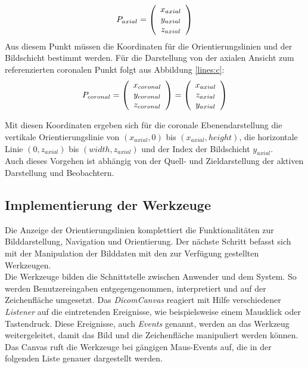 \begin{equation}
P_{axial}=\left(\begin{array}{c} x_{axial} \\ y_{axial} \\ z_{axial} \end{array}\right) 
\vspace{0.5cm}
\end{equation}
Aus diesem Punkt müssen die Koordinaten für die Orientierungslinien und der Bildschicht bestimmt werden.
Für die Darstellung von der axialen Ansicht zum referenzierten coronalen Punkt folgt aus Abbildung \ref{lines:c}:
\begin{equation}
P_{coronal}=\left(\begin{array}{c} x_{coronal} \\ y_{coronal} \\ z_{coronal} \end{array}\right) =
\left(\begin{array}{c} x_{axial} \\ z_{axial} \\ y_{axial} \end{array}\right)
\vspace{0.5cm}
\end{equation}

Mit diesen Koordinaten ergeben sich für die coronale Ebenendarstellung die vertikale Orientierungslinie von $(x_{axial}, 0)$ bis $(x_{axial}, height)$, die horizontale Linie $(0, z_{axial})$ bis $(width, z_{axial})$ und der Index der Bildschicht $y_{axial}$.\\
Auch dieses Vorgehen ist abhängig von der Quell- und Zieldarstellung der aktiven Darstellung und Beobachtern.

\subsection{Implementierung der Werkzeuge}

Die Anzeige der Orientierungslinien komplettiert die Funktionalitäten zur Bilddarstellung, Navigation und Orientierung. Der nächste Schritt befasst sich mit der Manipulation der Bilddaten mit den zur Verfügung gestellten Werkzeugen.\\
Die Werkzeuge bilden die Schnittstelle zwischen Anwender und dem System. So werden Benutzereingaben entgegengenommen, interpretiert und auf der Zeichenfläche umgesetzt. Das \textit{DicomCanvas} reagiert mit Hilfe verschiedener \textit{Listener} auf die eintretenden Ereignisse, wie beispielsweise einem Mausklick oder Tastendruck. Diese Ereignisse, auch \textit{Events} genannt, werden an das Werkzeug weitergeleitet, damit das Bild und die Zeichenfläche manipuliert werden können. Das Canvas ruft die Werkzeuge bei gängigen Maus-Events auf, die in der folgenden Liste genauer dargestellt werden.

